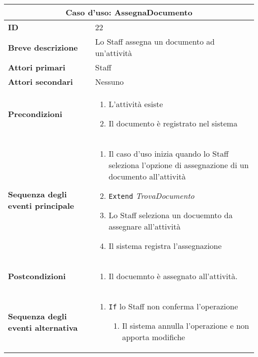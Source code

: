 \documentclass[a4paper]{report}
\begin{document}
\clearpage
\begin{table}[H]
\vspace*{-0cm}
\renewcommand{\arraystretch}{1.9}
\begin{tabular}{|p{3.9cm}|p{9.9cm}|}
\hline
\multicolumn{2}{|c|}{\textbf{Caso d’uso: AssegnaDocumento}} \\ \hline
	\textbf{ID} & 22 \\ \hline
	\textbf{Breve descrizione} & Lo Staff assegna un documento ad un’attività \\ \hline
	\textbf{Attori primari} & Staff \\ \hline
	\textbf{Attori secondari} & Nessuno \\ \hline
	\textbf{Precondizioni} & \begin{enumerate}[leftmargin=14pt,label=\arabic*.,labelsep=0.5em,topsep=0pt,partopsep=0pt,parsep=0pt,itemsep=0pt]
    \item L’attività esiste
    \item Il documento è registrato nel sistema
\end{enumerate} \\ \hline
	\textbf{Sequenza degli eventi principale} & \begin{enumerate}[leftmargin=14pt,label=\arabic*.,labelsep=0.5em,topsep=0pt,partopsep=0pt,parsep=0pt,itemsep=0pt]
    \item Il caso d'uso inizia quando lo Staff seleziona l'opzione di assegnazione di un documento all'attività
    \item \texttt{Extend} \textit{TrovaDocumento}
    \item Lo Staff seleziona un docuemnto da assegnare all'attività
    \item Il sistema registra l’assegnazione
\end{enumerate} \\ \hline
	\textbf{Postcondizioni} & \begin{enumerate}[label=\arabic*.,leftmargin=14pt,labelsep=0.5em,topsep=0pt,partopsep=0pt,parsep=0pt,itemsep=0pt]
        \item Il docuemnto è assegnato all’attività.
    \end{enumerate} \\ \hline
	\textbf{Sequenza degli eventi alternativa} & \begin{enumerate}[leftmargin=14pt,label=\arabic*.,labelsep=0.5em,topsep=0pt,partopsep=0pt,parsep=0pt,itemsep=0pt]
    \item \texttt{If} lo Staff non conferma l’operazione
    \begin{enumerate}[label=\arabic{enumi}.\arabic*.,leftmargin=22pt,labelsep=0.5em,topsep=0pt,partopsep=0pt,parsep=0pt,itemsep=0pt]
        \item Il sistema annulla l’operazione e non apporta modifiche
    \end{enumerate}
\end{enumerate} \\ \hline
\end{tabular}
\end{table}
\end{document}
